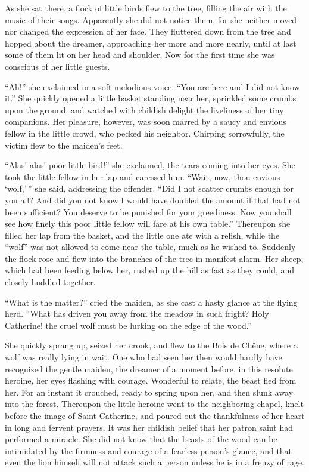 As she sat there, a flock of little birds flew to the tree, filling the
air with the music of their songs. Apparently she did not notice them,
for she neither moved nor changed the expression of her face. They
fluttered down from the tree and hopped about the dreamer, approaching
her more and more nearly, until at last some of them lit on her head and
shoulder. Now for the first time she was conscious of her little guests.

``Ah!'' she exclaimed in a soft melodious voice. ``You are here and I
did not know it.'' She quickly opened a little basket standing near her,
sprinkled some crumbs upon the ground, and watched with childish delight
the liveliness of her tiny companions. Her pleasure, however, was soon
marred by a saucy and envious fellow in the little crowd, who pecked his
neighbor. Chirping sorrowfully, the victim flew to the maiden's feet.

``Alas! alas! poor little bird!'' she exclaimed, the tears coming into
her eyes. She took the little fellow in her lap and caressed him.
``Wait, now, thou envious `wolf,'\,'' she said, addressing the offender.
``Did I not scatter crumbs enough for you all? And did you not know I
would have doubled the amount if that had not been sufficient? You
deserve to be punished for your greediness. Now you shall see how finely
this poor little fellow will fare at his own table.'' Thereupon she
filled her lap from the basket, and the little one ate with a relish,
while the ``wolf'' was not allowed to come near the table, much as he
wished to. Suddenly the flock rose and flew into the branches of the
tree in manifest alarm. Her sheep, which had been feeding below her,
rushed up the hill as fast as they could, and closely huddled together.

``What is the matter?'' cried the maiden, as she cast a hasty glance at
the flying herd. ``What has driven you away from the meadow in such
fright? Holy Catherine! the cruel wolf must be lurking on the edge of
the wood.''

She quickly sprang up, seized her crook, and flew to the Bois de Chêne,
where a wolf was really lying in wait. One who had seen her then would
hardly have recognized the gentle maiden, the dreamer of a moment
before, in this resolute heroine, her eyes flashing with courage.
Wonderful to relate, the beast fled from her. For an instant it
crouched, ready to spring upon her, and then slunk away into the forest.
Thereupon the little heroine went to the neighboring chapel, knelt
before the image of Saint Catherine, and poured out the thankfulness of
her heart in long and fervent prayers. It was her childish belief that
her patron saint had performed a miracle. She did not know that the
beasts of the wood can be intimidated by the firmness and courage of a
fearless person's glance, and that even the lion himself will not attack
such a person unless he is in a frenzy of rage.

